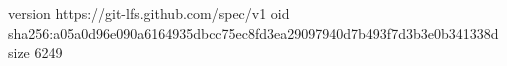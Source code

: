 version https://git-lfs.github.com/spec/v1
oid sha256:a05a0d96e090a6164935dbcc75ec8fd3ea29097940d7b493f7d3b3e0b341338d
size 6249
